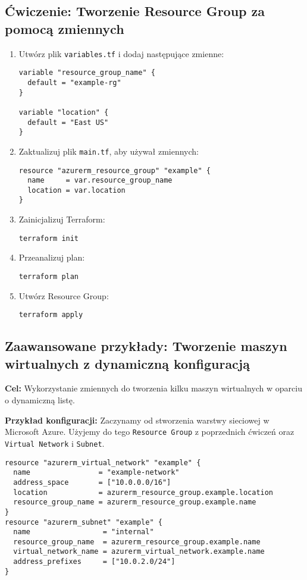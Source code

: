 \documentclass{article}
\begin{document}
\subsection{Ćwiczenie: Tworzenie Resource Group za pomocą zmiennych}
\begin{enumerate}
    \item Utwórz plik \texttt{variables.tf} i dodaj następujące zmienne:
    \begin{lstlisting}
variable "resource_group_name" {
  default = "example-rg"
}

variable "location" {
  default = "East US"
}
    \end{lstlisting}
    \item Zaktualizuj plik \texttt{main.tf}, aby używał zmiennych:
    \begin{lstlisting}
resource "azurerm_resource_group" "example" {
  name     = var.resource_group_name
  location = var.location
}
    \end{lstlisting}
    \item Zainicjalizuj Terraform:
    \begin{lstlisting}
terraform init
    \end{lstlisting}
    \item Przeanalizuj plan:
    \begin{lstlisting}
terraform plan
    \end{lstlisting}
    \item Utwórz Resource Group:
    \begin{lstlisting}
terraform apply
    \end{lstlisting}
\end{enumerate}

\subsection{Zaawansowane przykłady: Tworzenie maszyn wirtualnych z dynamiczną konfiguracją}
\textbf{Cel:} Wykorzystanie zmiennych do tworzenia kilku maszyn wirtualnych w oparciu o dynamiczną listę.

\textbf{Przykład konfiguracji:}
Zaczynamy od stworzenia warstwy sieciowej w Microsoft Azure. Użyjemy do tego \texttt{Resource Group} z poprzednich ćwiczeń oraz \texttt{Virtual Network} i \texttt{Subnet}.
\begin{lstlisting}
resource "azurerm_virtual_network" "example" {
  name                = "example-network"
  address_space       = ["10.0.0.0/16"]
  location            = azurerm_resource_group.example.location
  resource_group_name = azurerm_resource_group.example.name
}
resource "azurerm_subnet" "example" {
  name                 = "internal"
  resource_group_name  = azurerm_resource_group.example.name
  virtual_network_name = azurerm_virtual_network.example.name
  address_prefixes     = ["10.0.2.0/24"]
}

\end{lstlisting}
\end{document}
